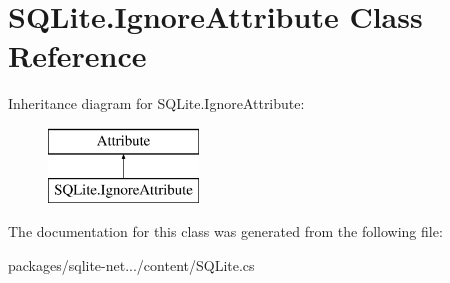 \hypertarget{classSQLite_1_1IgnoreAttribute}{}\section{S\+Q\+Lite.\+Ignore\+Attribute Class Reference}
\label{classSQLite_1_1IgnoreAttribute}
Inheritance diagram for S\+Q\+Lite.\+Ignore\+Attribute\+:\begin{figure}[H]
\begin{center}
\leavevmode
\includegraphics[height=2.000000cm]{classSQLite_1_1IgnoreAttribute}
\end{center}
\end{figure}


The documentation for this class was generated from the following file\+:\begin{DoxyCompactItemize}
\item 
packages/sqlite-\/net.../content/S\+Q\+Lite.\+cs\end{DoxyCompactItemize}
